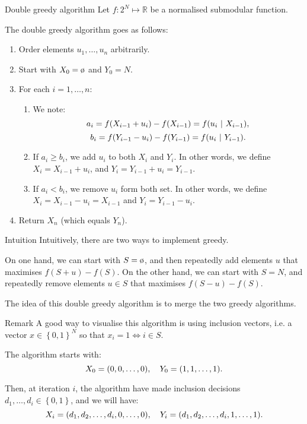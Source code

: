 \documentclass[a4paper]{article}
\begin{document}
\begin{parag}{Double greedy algorithm}
    Let $f: 2^N \mapsto \mathbb{R}$ be a normalised submodular function.

    The double greedy algorithm goes as follows:
    \begin{enumerate}
        \item Order elements $u_1, \ldots, u_n$ arbitrarily.
        \item Start with $X_0 = \o$ and $Y_0 = N$.
        \item For each $i = 1, \ldots, n$: 
            \begin{enumerate}
                \item We note: 
                \[a_i = f\left(X_{i-1} + u_i\right) - f\left(X_{i-1}\right) = f\left(u_i \suchthat X_{i-1}\right),\] 
                \[b_i = f\left(Y_{i-1} - u_i\right) - f\left(Y_{i-1}\right) = f\left(u_i \suchthat Y_{i-1}\right).\]
                \item If $a_i \geq b_i$, we add $u_i$ to both $X_i$ and $Y_i$. In other words, we define $X_i = X_{i-1} + u_i$, and $Y_i = Y_{i-1} + u_i = Y_{i-1}$.
                \item  If $a_i < b_i$, we remove $u_i$ form both set. In other words, we define $X_i = X_{i-1} - u_i = X_{i-1}$ and $Y_i = Y_{i-1} - u_i$.
            \end{enumerate}
        \item Return $X_n$ (which equals $Y_n$).
    \end{enumerate}

    \begin{subparag}{Intuition}
        Intuitively, there are two ways to implement greedy.

        On one hand, we can start with $S = \o$, and then repeatedly add elements $u$ that maximises $f\left(S + u\right) - f\left(S\right)$. On the other hand, we can start with $S = N$, and repeatedly remove elements $u \in S$ that maximises $f\left(S - u\right) - f\left(S\right)$.

        The idea of this double greedy algorithm is to merge the two greedy algorithms.
    \end{subparag}

    \begin{subparag}{Remark}
        A good way to visualise this algorithm is using inclusion vectors, i.e. a vector $x \in \left\{0, 1\right\}^N$ so that $x_i = 1 \iff i \in S$.

        The algorithm starts with: 
        \[X_0 = \left(0, 0, \ldots, 0\right), \mathspace Y_0 = \left(1, 1, \ldots, 1\right).\]
        
        Then, at iteration $i$, the algorithm have made inclusion decisions $d_1, \ldots, d_i \in \left\{0, 1\right\}$, and we will have: 
        \[X_i = \left(d_1, d_2, \ldots, d_i, 0, \ldots, 0\right), \mathspace Y_i = \left(d_1, d_2, \ldots, d_i, 1, \ldots, 1\right).\]
    \end{subparag}
\end{parag}
\end{document}
